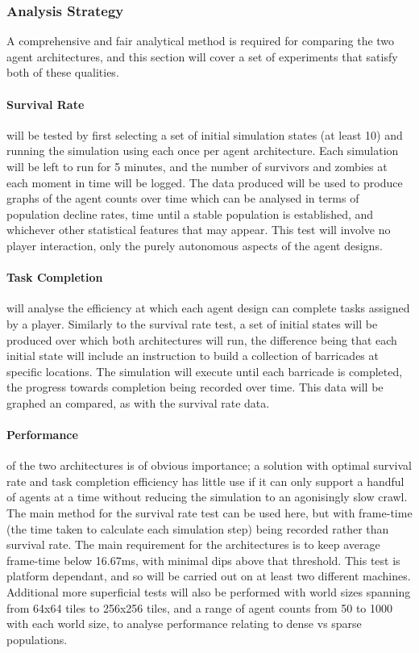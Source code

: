 \documentclass[12pt,a4paper]{article}
\begin{document}
\subsubsection{Analysis Strategy}\noindent
A comprehensive and fair analytical method is required for comparing the two agent architectures, and this section will cover a set of experiments that satisfy both of these qualities.

\paragraph{Survival Rate} will be tested by first selecting a set of initial simulation states (at least 10) and running the simulation using each once per agent architecture. Each simulation will be left to run for 5 minutes, and the number of survivors and zombies at each moment in time will be logged. The data produced will be used to produce graphs of the agent counts over time which can be analysed in terms of population decline rates, time until a stable population is established, and whichever other statistical features that may appear. This test will involve no player interaction, only the purely autonomous aspects of the agent designs.

\paragraph{Task Completion} will analyse the efficiency at which each agent design can complete tasks assigned by a player. Similarly to the survival rate test, a set of initial states will be produced over which both architectures will run, the difference being that each initial state will include an instruction to build a collection of barricades at specific locations. The simulation will execute until each barricade is completed, the progress towards completion being recorded over time. This data will be graphed an compared, as with the survival rate data.

\paragraph{Performance} of the two architectures is of obvious importance; a solution with optimal survival rate and task completion efficiency has little use if it can only support a handful of agents at a time without reducing the simulation to an agonisingly slow crawl. The main method for the survival rate test can be used here, but with frame-time (the time taken to calculate each simulation step) being recorded rather than survival rate. The main requirement for the architectures is to keep average frame-time below 16.67ms, with minimal dips above that threshold. This test is platform dependant, and so will be carried out on at least two different machines. Additional more superficial tests will also be performed with world sizes spanning from 64x64 tiles to 256x256 tiles, and a range of agent counts from 50 to 1000 with each world size, to analyse performance relating to dense vs sparse populations.

\nocite{vistud}
\nocite{opentk}

\end{document}
